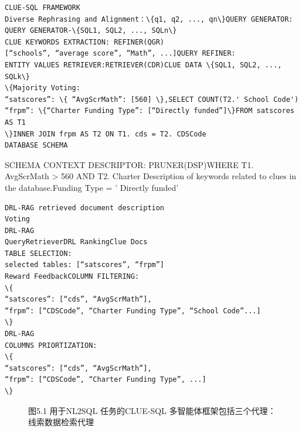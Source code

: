 \documentclass[12pt,a4paper,openright,UTF8]{ctexbook}
\begin{document}
\begin{lstlisting}
CLUE-SQL FRAMEWORK
Diverse Rephrasing and Alignment：\{q1, q2, ..., qn\}QUERY GENERATOR:
QUERY GENERATOR-\{SQL1, SQL2, ..., SQLn\}
CLUE KEYWORDS EXTRACTION: REFINER(QGR)
[“schools”, “average score”, “Math”, ...]QUERY REFINER:
ENTITY VALUES RETRIEVER:RETRIEVER(CDR)CLUE DATA \{SQL1, SQL2, ..., SQLk\}
\{Majority Voting:
“satscores”: \{ “AvgScrMath”: [560] \},SELECT COUNT(T2.' School Code')
“frpm”: \{“Charter Funding Type”: [“Directly funded”]\}FROM satscores AS T1
\}INNER JOIN frpm AS T2 ON T1. cds = T2. CDSCode
DATABASE SCHEMA
\end{lstlisting}
SCHEMA CONTEXT DESCRIPTOR: PRUNER(DSP)WHERE T1. AvgScrMath > 560 AND T2. Charter Description of keywords related to clues in the database.Funding Type = ' Directly funded'

\begin{lstlisting}
DRL-RAG retrieved document description
Voting
DRL-RAG
QueryRetrieverDRL RankingClue Docs
TABLE SELECTION:
selected tables: [“satscores”, “frpm”]
Reward FeedbackCOLUMN FILTERING:
\{
“satscores”: [“cds”, “AvgScrMath”],
“frpm”: [“CDSCode”, “Charter Funding Type”, “School Code”...]
\}
DRL-RAG
COLUMNS PRIORTIZATION:
\{
“satscores”: [“cds”, “AvgScrMath”],
“frpm”: [“CDSCode”, “Charter Funding Type”, ...]
\}
\end{lstlisting}

\begin{figure}[htbp]
\centering
{}
\caption{图5.1 用于NL2SQL 任务的CLUE-SQL 多智能体框架包括三个代理：线索数据检索代理}
\end{figure}
\end{document}
